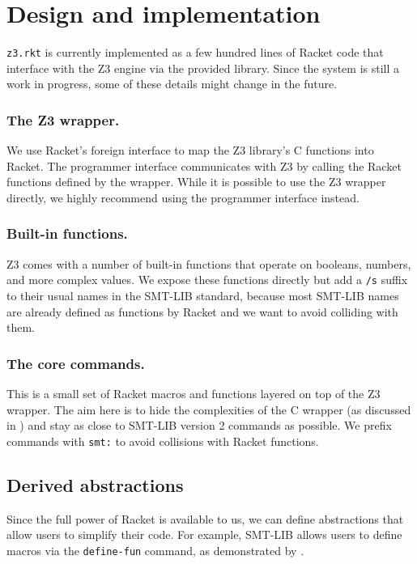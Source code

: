 \section{Design and implementation}
\label{sec:design-impl}

\texttt{z3.rkt} is currently implemented as a few hundred lines of Racket code
that interface with the Z3 engine via the provided library. Since the system is
still a work in progress, some of these details might change in the future.

\subsubsection{The Z3 wrapper.} We use Racket's foreign interface \cite{racket/foreign}
to map the Z3 library's C functions into Racket. The programmer interface
communicates with Z3 by calling the Racket functions defined by the
wrapper. While it is possible to use the Z3 wrapper directly, we highly
recommend using the programmer interface instead.

\subsubsection{Built-in functions.} Z3 comes with a number of built-in functions that
operate on booleans, numbers, and more complex values. We expose these
functions directly but add a \texttt{/s} suffix to their usual names in the
SMT-LIB standard, because most SMT-LIB names are already defined as functions
by Racket and we want to avoid colliding with them.

\subsubsection{The core commands.} This is a small set of Racket macros and
functions layered on top of the Z3 wrapper. The aim here is to hide the
complexities of the C wrapper (as discussed in ) and
stay as close to SMT-LIB version 2 commands \cite{smtlib2:10} as possible. We
prefix commands with \texttt{smt:} to avoid collisions with Racket functions.

\subsection{Derived abstractions}
\label{sec:derived}

Since the full power of Racket is available to us, we can define abstractions
that allow users to simplify their code. For example, SMT-LIB allows users to
define macros via the \texttt{define-fun} command, as demonstrated by
.

